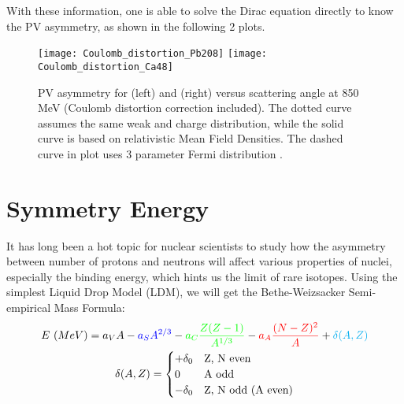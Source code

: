 With these information, one is able to solve the Dirac equation directly to know
the PV asymmetry, as shown in the following 2 plots.

\begin{figure}[H]
    \texttt{[image: Coulomb\_distortion\_Pb208]}
    \texttt{[image: Coulomb\_distortion\_Ca48]}
    \caption{PV asymmetry for \Pb (left) and \Ca (right) versus scattering angle 
    at 850 MeV (Coulomb distortion correction included). 
    The dotted curve assumes the same weak and charge distribution, 
    while the solid curve is based on relativistic Mean Field Densities. The
    dashed curve in \Pb plot uses 3 parameter Fermi distribution \cite{PhysRevC.57.3430}.
    }
    \label{fig:Coulomb_distortion}
\end{figure}

\section{Symmetry Energy} 
It has long been a hot topic for nuclear scientists to study how the asymmetry 
between number of protons and neutrons will affect various properties of nuclei, 
especially the binding energy, which hints us the limit of rare isotopes. Using the simplest 
Liquid Drop Model (LDM), we will get the Bethe-Weizsacker Semi-empirical Mass Formula:
\begin{equation}
    \begin{gathered}
	E\ (MeV) = \textcolor{black}{a_V A} 
	    - \textcolor{blue}{a_S A^{2/3}} 
	    - \textcolor{green}{a_C\frac{Z(Z-1)}{A^{1/3}}} 
	    - \textcolor{red}{a_A\frac{(N-Z)^2}{A}} 
	    + \textcolor{cyan}{\delta(A, Z)} \\
	\delta(A, Z) = 
	    \begin{cases}
		+\delta_0	& \text{Z, N even} \\
		0		& \text{A odd}	\\
		-\delta_0	& \text{Z, N odd (A even)} \\
	    \end{cases}
    \end{gathered}
    \label{eq:mass-formula}
\end{equation}

